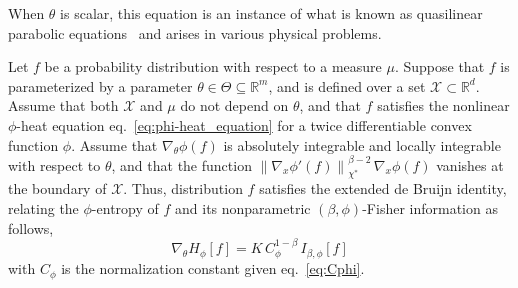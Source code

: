 \documentclass[entropy,article,submit,moreauthors,pdftex]{Definitions/mdpi}
\def\Rset{\mathbb{R}}%
\def\X{\mathcal{X}}%
\begin{document}
When  $\theta$ is  scalar, this  equation is  an instance  of what  is known  as
quasilinear  parabolic  equations~\cite[\S~8.8]{Rou05}  and  arises  in  various
physical problems.


\begin{Proposition}
\label{prop:phiDeBruijn}
%
  Let $f$ be a probability distribution with respect to a measure $\mu$. Suppose
  that  $f$  is  parameterized  by  a parameter  $\theta  \in  \Theta  \subseteq
  \Rset^m$, and  is defined over  a set $\X  \subset \Rset^d$. Assume  that both
  $\X$ and $\mu$ do not depend on $\theta$, and that $f$ satisfies the nonlinear
  $\phi$-heat    equation   eq.~\eqref{eq:phi-heat_equation}    for   a    twice
  differentiable convex function $\phi$.  Assume that $\nabla_\theta \phi(f)$ is
  absolutely integrable  and locally  integrable with  respect to  $\theta$, and
  that the  function $\left\|  \nabla_x \phi'(f)  \right\|_{\chi^*}^{\beta-2} \,
  \nabla_x \phi(f)$  vanishes at the  boundary of $\X$.  Thus,  distribution $f$
  satisfies the extended de Bruijn  identity, relating the $\phi$-entropy of $f$
  and its nonparametric $(\beta,\phi)$-Fisher information as follows,
  \begin{equation}
  \label{eq:phiDeBruijn}
  \nabla_\theta H_\phi[f] = K \, C_\phi^{1-\beta} \, I_{\beta,\phi}[f]
  \end{equation}
  with $C_\phi$ is the normalization constant given eq.~\eqref{eq:Cphi}.
\end{Proposition}
\end{document}
